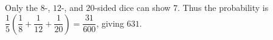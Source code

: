 Only the $8$-, $12$-, and $20$-sided dice can show $7$. Thus the probability is $\dfrac{1}{5}\left(\dfrac{1}{8}+\dfrac{1}{12}+\dfrac{1}{20}\right)=\dfrac{31}{600}$, giving $\boxed{631}$.
